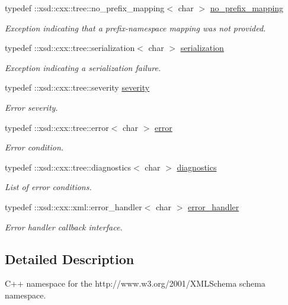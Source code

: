 \begin{DoxyCompactItemize}
typedef \+::xsd\+::cxx\+::tree\+::no\+\_\+prefix\+\_\+mapping$<$ char $>$ \hyperlink{namespacexml__schema_a03293581f2c90a05fbb910be49380e01}{no\+\_\+prefix\+\_\+mapping}
\begin{DoxyCompactList}\small\item\em Exception indicating that a prefix-\/namespace mapping was not provided. \end{DoxyCompactList}\item 
typedef \+::xsd\+::cxx\+::tree\+::serialization$<$ char $>$ \hyperlink{namespacexml__schema_a40e04a11c9e6204762591b4de3755899}{serialization}
\begin{DoxyCompactList}\small\item\em Exception indicating a serialization failure. \end{DoxyCompactList}\item 
typedef \+::xsd\+::cxx\+::tree\+::severity \hyperlink{namespacexml__schema_aaac8e21420b35e58ad94533db40ccf41}{severity}
\begin{DoxyCompactList}\small\item\em Error severity. \end{DoxyCompactList}\item 
typedef \+::xsd\+::cxx\+::tree\+::error$<$ char $>$ \hyperlink{namespacexml__schema_a13e2122658f2abee3c2da9829f2de129}{error}
\begin{DoxyCompactList}\small\item\em Error condition. \end{DoxyCompactList}\item 
typedef \+::xsd\+::cxx\+::tree\+::diagnostics$<$ char $>$ \hyperlink{namespacexml__schema_a62cc106990ec99fdaf2f3364d98cfabd}{diagnostics}
\begin{DoxyCompactList}\small\item\em List of error conditions. \end{DoxyCompactList}\item 
typedef \+::xsd\+::cxx\+::xml\+::error\+\_\+handler$<$ char $>$ \hyperlink{namespacexml__schema_abdee01986b8e16f04af47dd12038261e}{error\+\_\+handler}
\begin{DoxyCompactList}\small\item\em Error handler callback interface. \end{DoxyCompactList}\end{DoxyCompactItemize}


\subsection{Detailed Description}
C++ namespace for the http\+://www.w3.\+org/2001/\+X\+M\+L\+Schema schema namespace. 

